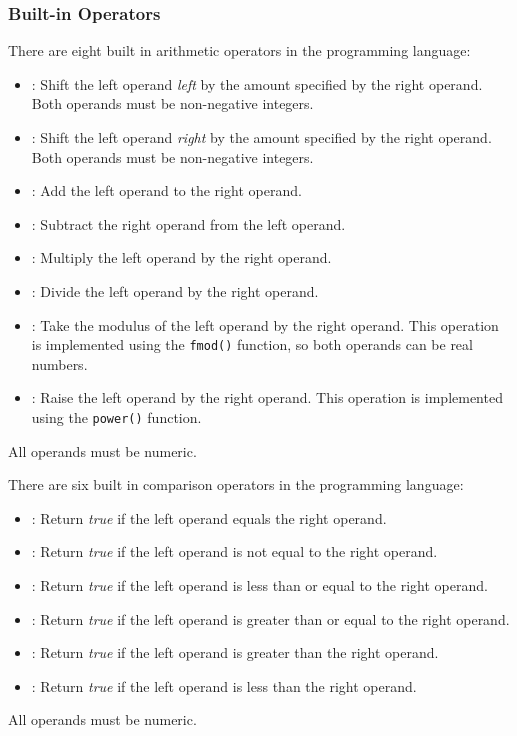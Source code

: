 \subsubsection{Built-in Operators}

There are eight built in arithmetic operators in the \ModLang programming language:
\begin{itemize}
\item \textbf{\oper{<<}}: Shift the left operand \emph{left} by the amount specified by the right operand.
  Both operands must be non-negative integers.
\item \textbf{\oper{>>}}: Shift the left operand \emph{right} by the amount specified by the right operand.
  Both operands must be non-negative integers.
\item \textbf{\oper{+}}: Add the left operand to the right operand.
\item \textbf{\oper{-}}: Subtract the right operand from the left operand.
\item \textbf{\oper{*}}: Multiply the left operand by the right operand.
\item \textbf{\oper{/}}: Divide the left operand by the right operand.
\item \textbf{\oper{\%}}: Take the modulus of the left operand by the right operand.  This operation is
  implemented using the \texttt{fmod()} function, so both operands can be
  real numbers.
\item \textbf{\oper{**}}: Raise the left operand by the right operand.  This operation is implemented
  using the \texttt{power()} function.
\end{itemize}
All operands must be numeric.

There are six built in comparison operators in the \ModLang programming language:
\begin{itemize}
\item \textbf{\oper{==}}: Return \emph{true} if the left operand equals the right operand.
\item \textbf{\opex{!=}}: Return \emph{true} if the left operand is not equal to the right operand.
\item \textbf{\oper{<=}}: Return \emph{true} if the left operand is less than or equal to the right operand.
\item \textbf{\oper{>=}}: Return \emph{true} if the left operand is greater than or equal to the right operand.
\item \textbf{\oper{>}}:  Return \emph{true} if the left operand is greater than the right operand.
\item \textbf{\oper{<}}:  Return \emph{true} if the left operand is less than the right operand.
\end{itemize}
All operands must be numeric.

